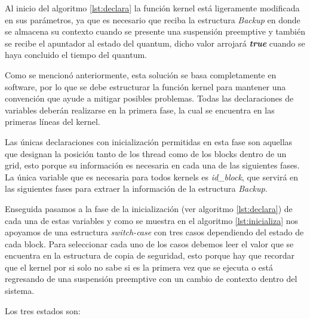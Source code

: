 Al inicio del algoritmo \ref{lst:declara} la función kernel está ligeramente modificada en sus parámetros, ya que es necesario que reciba la estructura \textit{Backup} en donde se almacena su contexto cuando se presente una suspensión preemptive y también se recibe el apuntador al estado del quantum, dicho valor arrojará \textbf{\textit{true}} cuando se haya concluido el tiempo del quantum.
\newline

Como se mencionó anteriormente, esta solución se basa completamente en software, por lo que se debe estructurar la función kernel para mantener una convención que ayude a mitigar posibles problemas. Todas las declaraciones de variables deberán realizarse en la primera fase, la cual se encuentra en las primeras líneas del kernel.
\newline

Las únicas declaraciones con inicialización permitidas en esta fase son aquellas que designan la posición tanto de los thread como de los blocks dentro de un grid, esto porque  su información es necesaria en cada una de las siguientes fases. La única variable que es necesaria para todos kernels es \textit{id\_block}, que servirá en las siguientes fases para extraer la información de la estructura \textit{Backup}.



Enseguida pasamos a la fase de la inicialización (ver algoritmo \ref{lst:declara}) de cada una de estas variables y como se muestra en el algoritmo \ref{lst:inicializa} nos apoyamos de una estructura \textit{switch-case} con tres casos dependiendo del estado de cada block. Para seleccionar cada uno de los casos debemos leer el valor que se encuentra en la estructura de copia de seguridad, esto porque hay que recordar que el kernel por si solo no sabe si es la primera vez que se ejecuta o está regresando de una suspensión preemptive con un cambio de contexto dentro del sistema.

Los tres estados son:

